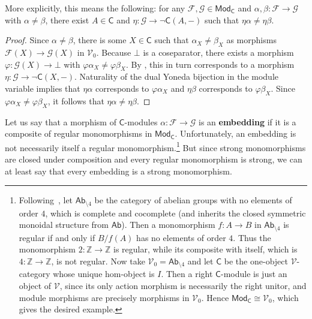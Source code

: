 \documentclass[11pt,onecolumn]{article}
\newcommand{\Z}{\mathbb{Z}}
\newcommand{\cV}{\mathscr{V}}
\newcommand{\cC}{\mathsf{C}}
\newcommand{\Ab}{\mathsf{Ab}}
\newcommand{\Mod}{\mathsf{Mod}}
\theoremstyle{plain}
\theoremstyle{remark}
\theoremstyle{definition}
\begin{document}
More explicitly, this means the following:
for any $\mathcal{F}, \mathcal{G} \in \Mod_\cC$ and $\alpha, \beta \colon \mathcal{F} \to \mathcal{G}$ with $\alpha \neq \beta$, there exist $A \in \cC$ and $\eta \colon \mathcal{G} \to \neg \cC(A, -)$ such that $\eta \alpha \neq \eta \beta$.

\begin{proof}
	Since $\alpha \neq \beta$, there is some $X \in \cC$ such that $\alpha_X \neq \beta_X$ as morphisms $\mathcal{F}(X) \to \mathcal{G}(X)$ in $\cV_0$.
	Because $\bot$ is a coseparator, there exists a morphism $\varphi \colon \mathcal{G}(X) \to \bot$
	with $\varphi \alpha_X \neq \varphi \beta_X$.
	By , this in turn corresponds to a morphism $\eta \colon \mathcal{G} \longrightarrow \neg \cC(X, -)$.
	Naturality of the dual Yoneda bijection in the module variable implies that $\eta\alpha$ corresponds to $\varphi\alpha_X$ and $\eta\beta$ corresponds to $\varphi\beta_X$.
	Since $\varphi \alpha_X \neq \varphi \beta_X$, it follows that $\eta \alpha \neq \eta \beta$.
\end{proof}

Let us say that a morphism of $\cC$-modules $\alpha \colon \mathcal{F} \to \mathcal{G}$ is an \textbf{embedding} if it is a composite of regular monomorphisms in $\Mod_\cC$.
Unfortunately, an embedding is not necessarily itself a regular monomorphism.\footnote{Following~\cite[p.~127]{KellyMonomorphismsPullbacks}, let $\Ab_{\setminus 4}$ be the category of abelian groups with no elements of order $4$, which is complete and cocomplete (and inherits the closed symmetric monoidal structure from $\Ab$). Then a monomorphism $f \colon A \to B$ in $\Ab_{\setminus 4}$ is regular if and only if $B/f(A)$ has no elements of order $4$. Thus the monomorphism $2 \colon \Z \to \Z$ is regular, while its composite with itself, which is $4 \colon \Z \to \Z$, is not regular. Now take $\cV_0 = \Ab_{\setminus 4}$ and let $\cC$ be the one-object $\cV$-category whose unique hom-object is $I$. Then a right $\cC$-module is just an object of $\cV$, since its only action morphism is necessarily the right unitor, and module morphisms are precisely morphisms in $\cV_0$. Hence $\Mod_\cC \cong \cV_0$, which gives the desired example.}
But since strong monomorphisms are closed under composition and every regular monomorphism is strong, we can at least say that every embedding is a strong monomorphism.
\end{document}
